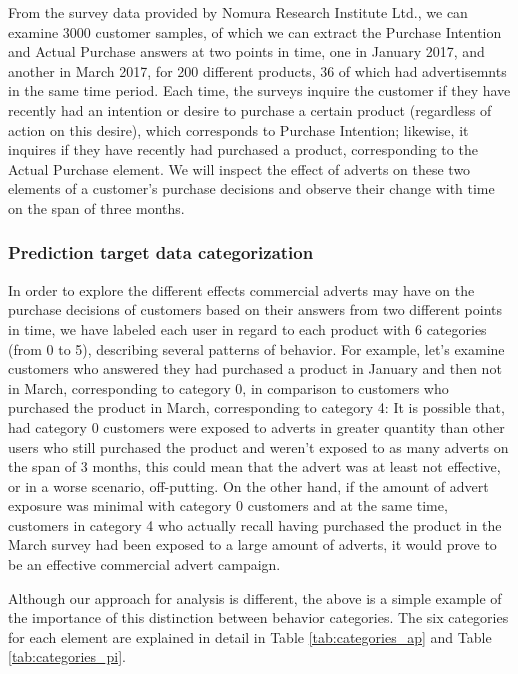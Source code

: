 \documentclass[review]{elsarticle}
\begin{document}
From the survey data provided by Nomura Research Institute Ltd., we can examine 3000 customer samples, of which we can extract the Purchase Intention and Actual Purchase answers at two points in time, one in January 2017, and another in March 2017, for 200 different products, 36 of which had advertisemnts in the same time period. Each time, the surveys inquire the customer if they have recently had an intention or desire to purchase a certain product (regardless of action on this desire), which corresponds to Purchase Intention; likewise, it inquires if they have recently had purchased a product, corresponding to the Actual Purchase element. We will inspect the effect of adverts on these two elements of a customer's purchase decisions and observe their change with time on the span of three months.

\subsubsection{Prediction target data categorization}
\label{target_data_cat}

In order to explore the different effects commercial adverts may have on the purchase decisions of customers based on their answers from two different points in time, we have labeled each user in regard to each product with 6 categories (from 0 to 5), describing several patterns of behavior. For example, let's examine customers who answered they had purchased a product in January and then not in March, corresponding to category 0, in comparison to customers who purchased the product in March, corresponding to category 4: It is possible that, had category 0 customers were exposed to adverts in greater quantity than other users who still purchased the product and weren't exposed to as many adverts on the span of 3 months, this could mean that the advert was at least not effective, or in a worse scenario, off-putting. On the other hand, if the amount of advert exposure was minimal with category 0 customers and at the same time, customers in category 4 who actually recall having purchased the product in the March survey had been exposed to a large amount of adverts, it would prove to be an effective commercial advert campaign.

Although our approach for analysis is different, the above is a simple example of the importance of this distinction between behavior categories. The six categories for each element are explained in detail in Table \ref{tab:categories_ap} and Table \ref{tab:categories_pi}.
\end{document}
